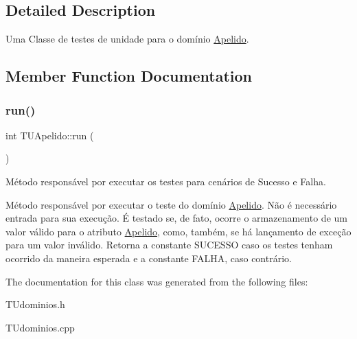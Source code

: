 \subsection{Detailed Description}
Uma Classe de testes de unidade para o domínio \hyperlink{classApelido}{Apelido}. 

\subsection{Member Function Documentation}
\mbox{\label{classTUApelido_ab5aabaa60fd00030d047ef8bf6c55fec}} 
\subsubsection{\texorpdfstring{run()}{run()}}
{\footnotesize\ttfamily int T\+U\+Apelido\+::run (\begin{DoxyParamCaption}{ }\end{DoxyParamCaption})}



Método responsável por executar os testes para cenários de Sucesso e Falha. 

Método responsável por executar o teste do domínio \hyperlink{classApelido}{Apelido}. Não é necessário entrada para sua execução. É testado se, de fato, ocorre o armazenamento de um valor válido para o atributo \hyperlink{classApelido}{Apelido}, como, também, se há lançamento de exceção para um valor inválido. Retorna a constante S\+U\+C\+E\+S\+SO caso os testes tenham ocorrido da maneira esperada e a constante F\+A\+L\+HA, caso contrário. 

The documentation for this class was generated from the following files\+:\begin{DoxyCompactItemize}
\item 
T\+Udominios.\+h\item 
T\+Udominios.\+cpp\end{DoxyCompactItemize}

